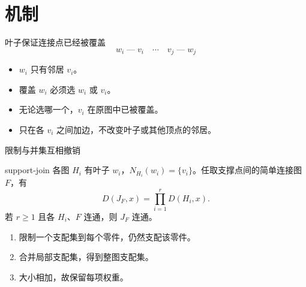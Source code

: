 \documentclass{beamer}
\begin{document}
\section{机制}
\begin{frame}{叶子保证连接点已经被覆盖}
\[w_i\;\text{---}\;v_i\quad\cdots\quad v_j\;\text{---}\;w_j\]
\begin{itemize}
\item $w_i$ 只有邻居 $v_i$。
\item 覆盖 $w_i$ 必须选 $w_i$ 或 $v_i$。
\item 无论选哪一个，$v_i$ 在原图中已被覆盖。
\item 只在各 $v_i$ 之间加边，不改变叶子或其他顶点的邻居。
\end{itemize}
\end{frame}
\begin{frame}{限制与并集互相撤销}
\begin{bookresult}{support-join}
各图 $H_i$ 有叶子 $w_i$，$N_{H_i}(w_i)=\{v_i\}$。任取支撑点间的简单连接图 $F$，有
\[D(J_F,x)=\prod_{i=1}^rD(H_i,x).\]
若 $r\geq1$ 且各 $H_i$、$F$ 连通，则 $J_F$ 连通。
\end{bookresult}
\begin{enumerate}
\item 限制一个支配集到每个零件，仍然支配该零件。
\item 合并局部支配集，得到整图支配集。
\item 大小相加，故保留每项权重。
\end{enumerate}
\end{frame}
\end{document}
